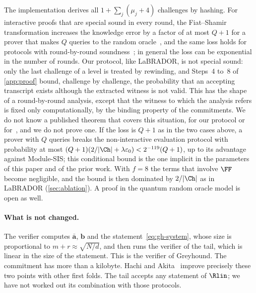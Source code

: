 The implementation derives all $1+\sum_j(\mu_j+4)$ challenges by hashing. For interactive proofs that are special sound in every round, the Fiat--Shamir transformation increases the knowledge error by a factor of at most $Q+1$ for a prover that makes $Q$ queries to the random oracle~\cite{AFK22}, and the same loss holds for protocols with round-by-round soundness~\cite{BCS16,CCH19}; in general the loss can be exponential in the number of rounds. Our protocol, like LaBRADOR, is not special sound: only the last challenge of a level is treated by rewinding, and Steps~4 to~8 of \cref{app:proof} bound, challenge by challenge, the probability that an accepting transcript exists although the extracted witness is not valid. This has the shape of a round-by-round analysis, except that the witness to which the analysis refers is fixed only computationally, by the binding property of the commitments. We do not know a published theorem that covers this situation, for our protocol or for~\cite{BS23,NS24}, and we do not prove one. If the loss is $Q+1$ as in the two cases above, a prover with $Q$ queries breaks the non-interactive evaluation protocol with probability at most $(Q+1)(2/\lvert\Ch\rvert+\lambda\varepsilon_0)<2^{-119}(Q+1)$, up to its advantage against Module-SIS; this conditional bound is the one implicit in the parameters of this paper and of the prior work. With $f=8$ the terms that involve $\FF$ become negligible, and the bound is then dominated by $2/\lvert\Ch\rvert$ as in LaBRADOR (\cref{sec:ablation}). A proof in the quantum random oracle model is open as well.

\paragraph{What is not changed.}
The verifier computes $\bar{\mathbf a}$, $\mathbf b$ and the statement~\eqref{eq:gh-system}, whose size is proportional to $m+r\approx\sqrt{N/d}$, and then runs the verifier of the tail, which is linear in the size of the statement. This is the verifier of Greyhound. The commitment has more than a kilobyte. Hachi and Akita~\cite{NOZ26,DBK26} improve precisely these two points with other first folds. The tail accepts any statement of $\Rlin$; we have not worked out its combination with those protocols.
